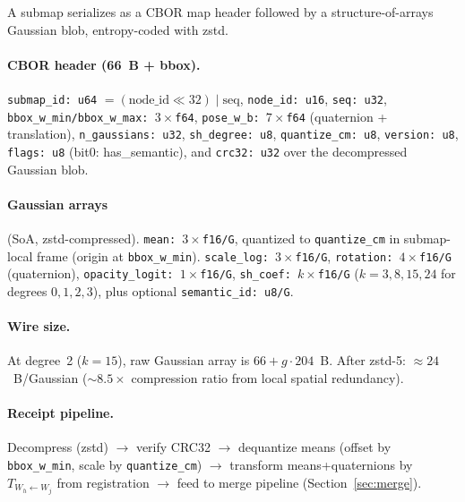 \label{app:submap}

A submap serializes as a CBOR map header followed by a structure-of-arrays
Gaussian blob, entropy-coded with zstd.

\paragraph{CBOR header (66~B + bbox).}
\texttt{submap\_id: u64} $=(\text{node\_id}\ll 32)\mid\text{seq}$,
\texttt{node\_id: u16}, \texttt{seq: u32},
\texttt{bbox\_w\_min/bbox\_w\_max: $3\times$f64},
\texttt{pose\_w\_b: $7\times$f64} (quaternion + translation),
\texttt{n\_gaussians: u32}, \texttt{sh\_degree: u8},
\texttt{quantize\_cm: u8}, \texttt{version: u8},
\texttt{flags: u8} (bit0: has\_semantic), and \texttt{crc32: u32}
over the decompressed Gaussian blob.

\paragraph{Gaussian arrays} (SoA, zstd-compressed).
\texttt{mean: $3\times$f16/G}, quantized to \texttt{quantize\_cm} in
submap-local frame (origin at \texttt{bbox\_w\_min}).
\texttt{scale\_log: $3\times$f16/G},
\texttt{rotation: $4\times$f16/G} (quaternion),
\texttt{opacity\_logit: $1\times$f16/G},
\texttt{sh\_coef: $k\times$f16/G} ($k=3,8,15,24$ for degrees $0,1,2,3$),
plus optional \texttt{semantic\_id: u8/G}.

\paragraph{Wire size.} At degree~2 ($k=15$), raw Gaussian array is
$66 + g\cdot204$~B. After zstd-5: $\approx 24$~B/Gaussian
($\sim 8.5\times$ compression ratio from local spatial redundancy).

\paragraph{Receipt pipeline.} Decompress (zstd) $\to$ verify CRC32 $\to$
dequantize means (offset by \texttt{bbox\_w\_min}, scale by
\texttt{quantize\_cm}) $\to$ transform means+quaternions by
$T_{W_h\leftarrow W_j}$ from registration $\to$ feed to merge pipeline
(Section~\ref{sec:merge}).
